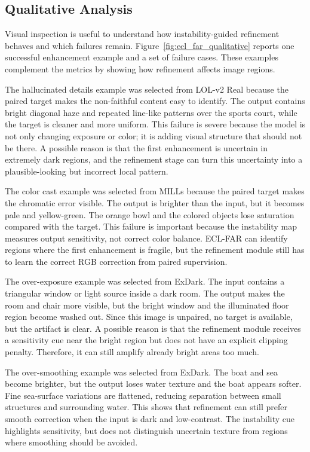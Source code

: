 \subsection{Qualitative Analysis}

Visual inspection is useful to understand how instability-guided refinement behaves and which failures remain. Figure~\ref{fig:ecl_far_qualitative} reports one successful enhancement example and a set of failure cases. These examples complement the metrics by showing how refinement affects image regions.



The hallucinated details example was selected from LOL-v2 Real because the paired target makes the non-faithful content easy to identify. The output contains bright diagonal haze and repeated line-like patterns over the sports court, while the target is cleaner and more uniform. This failure is severe because the model is not only changing exposure or color; it is adding visual structure that should not be there. A possible reason is that the first enhancement is uncertain in extremely dark regions, and the refinement stage can turn this uncertainty into a plausible-looking but incorrect local pattern.

The color cast example was selected from MILLs because the paired target makes the chromatic error visible. The output is brighter than the input, but it becomes pale and yellow-green. The orange bowl and the colored objects lose saturation compared with the target. This failure is important because the instability map measures output sensitivity, not correct color balance. ECL-FAR can identify regions where the first enhancement is fragile, but the refinement module still has to learn the correct RGB correction from paired supervision.

The over-exposure example was selected from ExDark. The input contains a triangular window or light source inside a dark room. The output makes the room and chair more visible, but the bright window and the illuminated floor region become washed out. Since this image is unpaired, no target is available, but the artifact is clear. A possible reason is that the refinement module receives a sensitivity cue near the bright region but does not have an explicit clipping penalty. Therefore, it can still amplify already bright areas too much.

The over-smoothing example was selected from ExDark. The boat and sea become brighter, but the output loses water texture and the boat appears softer. Fine sea-surface variations are flattened, reducing separation between small structures and surrounding water. This shows that refinement can still prefer smooth correction when the input is dark and low-contrast. The instability cue highlights sensitivity, but does not distinguish uncertain texture from regions where smoothing should be avoided.

